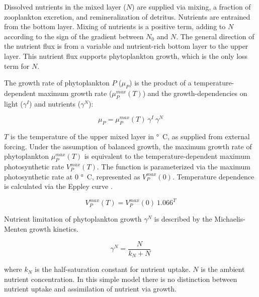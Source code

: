 \documentclass[journal abbreviation, manuscript]{copernicus}
\begin{document}
Dissolved nutrients in the mixed layer ($N$) are supplied via mixing, a fraction of zooplankton excretion, and remineralization of detritus.
Nutrients are entrained from the bottom layer. Mixing of nutrients is a positive term, adding to $N$ according to the sign of the gradient between $N_0$ and $N$. The general direction of the nutrient flux is from a variable and nutrient-rich bottom layer to the upper layer. This nutrient flux supports phytoplankton growth, which is the only loss term for $N$.

The growth rate of phytoplankton $P$ ($\mu_{P}$) is the product of a temperature-dependent maximum growth rate ($\mu_P^{max}(T)$) and the growth-dependencies on light ($\gamma^{I}$) and nutrients ($\gamma^{N}$): 

\begin{equation}
    \mu_{P} = \mu_P^{max}(T) \ \gamma^{I} \ \gamma^{N}
\end{equation}

$T$ is the temperature of the upper mixed layer in \unit{\degree C}, as supplied from external forcing. Under the assumption of balanced growth, the maximum growth rate of phytoplankton $\mu_P^{max}(T)$ is equivalent to the temperature-dependent maximum photosynthetic rate $V_P^{max}(T)$. The function is parameterized via the maximum photosynthetic rate at 0 \unit{\degree C}, represented as $V_P^{max}(0)$. Temperature dependence is calculated via the Eppley curve \citep{Eppley1972TemperatureSea}.

\begin{equation}
    V_P^{max}(T) = V_P^{max}(0) \ 1.066^T
\end{equation}

Nutrient limitation of phytoplankton growth $\gamma^N$ is described by the Michaelis-Menten growth kinetics.

\begin{equation}
    \gamma^N = \frac{N}{k_N + N}
\end{equation}

where $k_N$ is the half-saturation constant for nutrient uptake. $N$ is the ambient nutrient concentration. In this simple model there is no distinction between nutrient uptake and assimilation of nutrient via growth.
\end{document}
